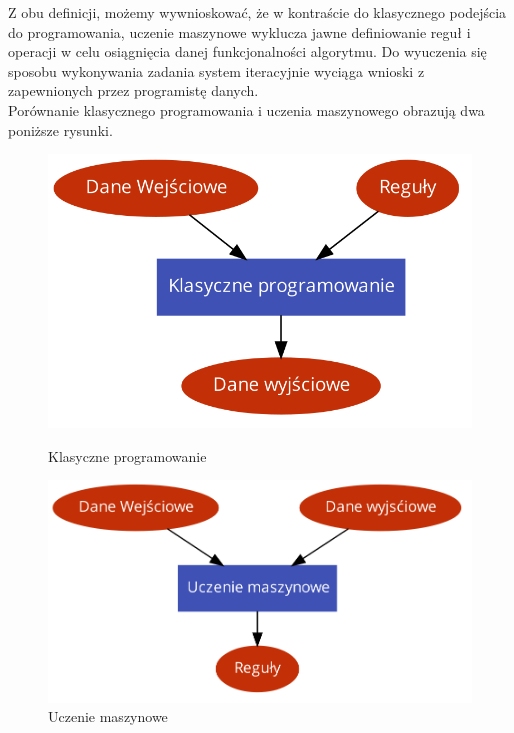 Z obu definicji, możemy wywnioskować, że w kontraście do klasycznego podejścia do programowania, uczenie maszynowe wyklucza jawne definiowanie reguł i operacji w celu osiągnięcia danej funkcjonalności algorytmu. Do wyuczenia się sposobu wykonywania zadania system iteracyjnie wyciąga wnioski z zapewnionych przez programistę danych.\\
Porównanie klasycznego programowania i uczenia maszynowego obrazują dwa poniższe rysunki.

\begin{figure}[h!]
    
    \begin{center}
        \includegraphics[scale=0.55]{img/Classic.png}
        \caption{Klasyczne programowanie}
        \label{fig:Klasyczne programowanie}    
    \end{center}
    
    \begin{center}
        \includegraphics[scale=0.52]{img/ML.png}
        \caption{Uczenie maszynowe}
        \label{fig:Uczenie maszynowe}
    \end{center}
    
\end{figure}

